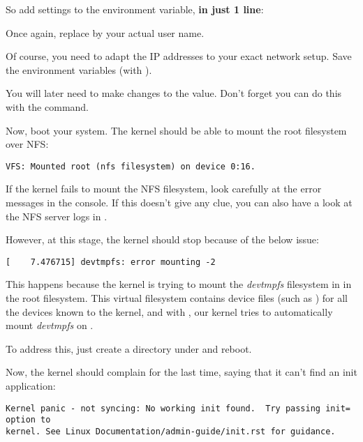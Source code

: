 So add settings to the  environment variable,
{\bf in just 1 line}:

{\footnotesize
{}
}

Once again, replace  by your actual user name.

Of course, you need to adapt the IP addresses to your exact network
setup. Save the environment variables (with ).

You will later need to make changes to the  value.
Don't forget you can do this with the  command.

Now, boot your system. The kernel should be able to mount the root
filesystem over NFS:

\begin{verbatim}
VFS: Mounted root (nfs filesystem) on device 0:16.
\end{verbatim}

If the kernel fails to mount the NFS filesystem, look carefully at the
error messages in the console. If this doesn't give any clue, you can
also have a look at the NFS server logs in .

However, at this stage, the kernel should stop because of the below
issue:

\begin{verbatim}
[    7.476715] devtmpfs: error mounting -2
\end{verbatim}

This happens because the kernel is trying to mount the {\em devtmpfs}
filesystem in  in the root filesystem. This virtual
filesystem contains device files (such as ) for all the
devices known to the kernel, and with ,
our kernel tries to automatically mount {\em devtmpfs} on .

To address this, just create a  directory under 
and reboot.

Now, the kernel should complain for the last time, saying that it can't
find an init application:

\begin{verbatim}
Kernel panic - not syncing: No working init found.  Try passing init= option to
kernel. See Linux Documentation/admin-guide/init.rst for guidance.
\end{verbatim}

